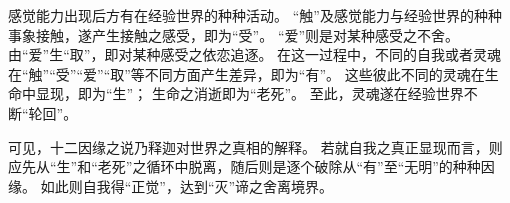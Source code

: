 \documentclass[11pt]{article}
\begin{document}
\par

感觉能力出现后方有在经验世界的种种活动。
“触”及感觉能力与经验世界的种种事象接触，遂产生接触之感受，即为“受”。
“爱”则是对某种感受之不舍。
由“爱”生“取”，即对某种感受之依恋追逐。
在这一过程中，不同的自我或者灵魂在“触”“受”“爱”“取”等不同方面产生差异，即为“有”。
这些彼此不同的灵魂在生命中显现，即为“生”；
生命之消逝即为“老死”。
至此，灵魂遂在经验世界不断“轮回”。

\par

可见，十二因缘之说乃释迦对世界之真相的解释。
若就自我之真正显现而言，则应先从“生”和“老死”之循环中脱离，随后则是逐个破除从“有”至“无明”的种种因缘。
如此则自我得“正觉”，达到“灭”谛之舍离境界。
\end{document}
